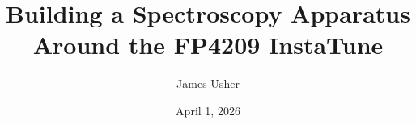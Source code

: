 \documentclass[12pt,oneside]{amsbook}
\numberwithin{equation}{chapter}
\numberwithin{figure}{chapter}
\theoremstyle{plain} %
\theoremstyle{definition}
\theoremstyle{remark}
\begin{document}
\frontmatter %
\title[]{Building a Spectroscopy Apparatus Around the FP4209 InstaTune}
\author{James Usher}
\address{Department of Physics and Astronomy \\Bates College\\Lewiston, ME 04240}
\date{April 1, 2026}
\maketitle

\thispagestyle{empty} 			%
\setcounter{page}{2}

\tableofcontents




\mainmatter %





\backmatter

\end{document}

